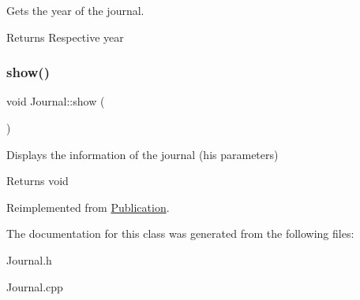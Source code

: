 Gets the year of the journal. 

\begin{DoxyReturn}{Returns}
Respective year 
\end{DoxyReturn}
\mbox{\label{class_journal_a7131809f3865fbdcbba5f38996d29c7a}} 
\subsubsection{\texorpdfstring{show()}{show()}}
{\footnotesize\ttfamily void Journal\+::show (\begin{DoxyParamCaption}{ }\end{DoxyParamCaption})\hspace{0.3cm}{\ttfamily [virtual]}}



Displays the information of the journal (his parameters) 

\begin{DoxyReturn}{Returns}
void 
\end{DoxyReturn}


Reimplemented from \hyperlink{class_publication_aa4240a04fcecd6257e0d1a33e8f18ff0}{Publication}.



The documentation for this class was generated from the following files\+:\begin{DoxyCompactItemize}
\item 
Journal.\+h\item 
Journal.\+cpp\end{DoxyCompactItemize}
